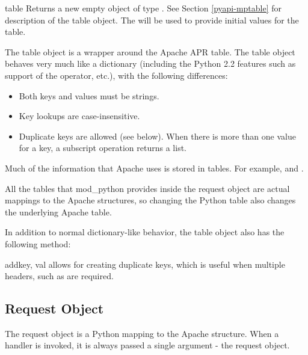 \begin{classdesc}{table}{}
  Returns a new empty object of type . See Section
  \ref{pyapi-mptable} for description of the table object. The
   will be used to provide initial values for
  the table.  

  The table object is a wrapper around the Apache APR table. The table
  object behaves very much like a dictionary (including the Python 2.2
  features such as support of the  operator, etc.), with the 
  following differences:

  \begin{itemize}
  \item
    Both keys and values must be strings.
  \item
    Key lookups are case-insensitive.
  \item
    Duplicate keys are allowed (see  below). When there is
    more than one value for a key, a subscript operation returns a list.
  \end{itemize}

  Much of the information that Apache uses is stored in tables. For
  example,  and .

  All the tables that mod_python provides inside the request
  object are actual mappings to the Apache structures, so changing the
  Python table also changes the underlying Apache table.

  In addition to normal dictionary-like behavior, the table object also
  has the following method:

  \begin{methoddesc}[table]{add}{key, val}
     allows for creating duplicate keys, which is useful 
    when multiple headers, such as  are required.
  \end{methoddesc}

\end{classdesc}

\subsection{Request Object\label{pyapi-mprequest}}

The request object is a Python mapping to the Apache
 structure. When a handler is invoked, it is always
passed a single argument - the request object. 

